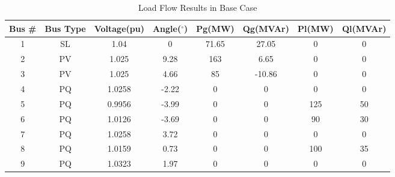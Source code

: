 \begin{table}[h!]
	\centering
	\resizebox{\textwidth}{!}
	{
	\begin{tabular}{cclccccc}
		\hline
		Bus \# & Bus Type & \multicolumn{1}{c}{Voltage(pu)} & Angle($^{\circ}$) & Pg(MW)& Qg(MVAr)& Pl(MW)  & Ql(MVAr) \\ \hline
		1      & SL       & \multicolumn{1}{c}{1.04}    & 0     & 71.65 & 27.05  & 0   & 0  \\
		2      & PV       & \multicolumn{1}{c}{1.025}   & 9.28  & 163   & 6.65   & 0   & 0  \\
		3      & PV       & \multicolumn{1}{c}{1.025}   & 4.66  & 85    & -10.86 & 0   & 0  \\
		4      & PQ       & \multicolumn{1}{c}{1.0258}                      & -2.22 & 0     & 0      & 0   & 0  \\
		5      & PQ       & \multicolumn{1}{c}{0.9956}                      & -3.99 & 0     & 0      & 125 & 50 \\
		6      & PQ       & \multicolumn{1}{c}{1.0126}                      & -3.69 & 0     & 0      & 90  & 30 \\
		7      & PQ       & \multicolumn{1}{c}{1.0258}                      & 3.72  & 0     & 0      & 0   & 0  \\
		8      & PQ       & \multicolumn{1}{c}{1.0159}                      & 0.73  & 0     & 0      & 100 & 35 \\
		9      & PQ       & \multicolumn{1}{c}{1.0323}                      & 1.97  & 0     & 0      & 0   & 0  \\ \hline
	\end{tabular}
}
	\caption{Load Flow Results in Base Case}
	\label{loadflow_case1}
\end{table}

